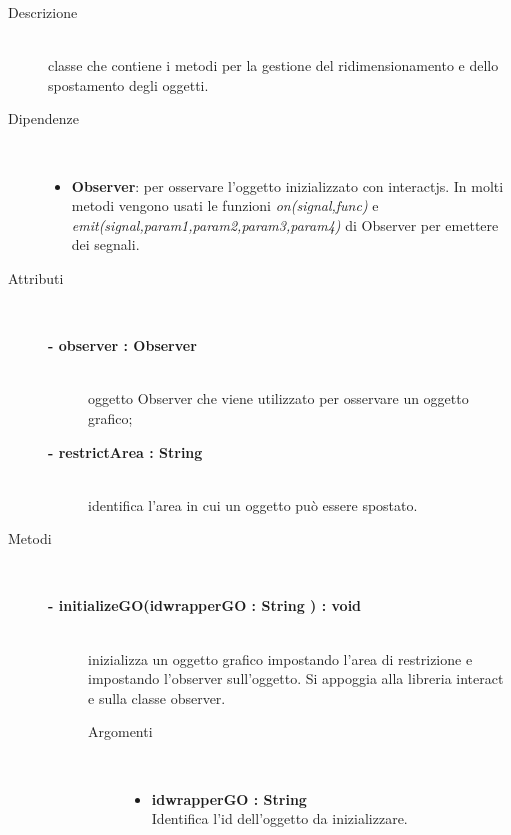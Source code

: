 \begin{description}
\item[Descrizione] \hfill \\
	classe che contiene i metodi per la gestione del ridimensionamento e dello spostamento degli oggetti. 
	
	\item[Dipendenze] \hfill \\
	\begin{itemize}
		\item \textbf{Observer}: per osservare l'oggetto inizializzato con interactjs. In molti metodi vengono usati le funzioni \textit{on(signal,func)} e \textit{emit(signal,param1,param2,param3,param4)} di Observer per emettere dei segnali.
	\end{itemize}
	
\item[Attributi] \hfill \\
	\begin{description}
		\item[\textbf{- observer : Observer			}] \hfill \\
			oggetto Observer che viene utilizzato per osservare un oggetto grafico;
		\item[\textbf{- 	restrictArea : String		}] \hfill \\
			identifica l'area in cui un oggetto può essere spostato.
	\end{description}
	
	
\item[Metodi] \hfill \\

	\begin{description}
		\item[\textbf{\color{blue}- initializeGO(idwrapperGO : String	) : void		}] \hfill \\
			inizializza un oggetto grafico impostando l'area di restrizione e impostando l'observer sull'oggetto. Si appoggia alla libreria interact e sulla classe observer.
			
		\begin{description}
			\item[Argomenti] \hfill \\
				\begin{itemize}
				
					\item \textbf{idwrapperGO : String			} \hfill \\
						Identifica l'id dell'oggetto da inizializzare.
					

\end{itemize}
\end{description}
\end{description}
\end{description}

